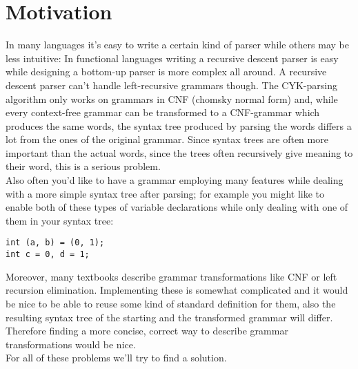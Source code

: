 \documentclass[a4paper]{article}
\begin{document}

\section*{Motivation}
In many languages it's easy to write a certain kind of parser while others may be less intuitive: In functional languages writing a recursive descent parser is easy while designing a bottom-up parser is more complex all around. A recursive descent parser can't handle left-recursive grammars though. The CYK-parsing algorithm only works on grammars in CNF (chomsky normal form) and, while every context-free grammar can be transformed to a CNF-grammar which produces the same words, the syntax tree produced by parsing the words differs a lot from the ones of the original grammar. Since syntax trees are often more important than the actual words, since the trees often recursively give meaning to their word, this is a serious problem.\\
Also often you'd like to have a grammar employing many features while dealing with a more simple syntax tree after parsing; for example you might like to enable both of these types of variable declarations while only dealing with one of them in your syntax tree:
\begin{verbatim}
int (a, b) = (0, 1);
int c = 0, d = 1;
\end{verbatim}
Moreover, many textbooks describe grammar transformations like CNF or left recursion elimination. Implementing these is somewhat complicated and it would be nice to be able to reuse some kind of standard definition for them, also the resulting syntax tree of the starting and the transformed grammar will differ. Therefore finding a more concise, correct way to describe grammar transformations would be nice.\\
For all of these problems we'll try to find a solution.
\end{document}
